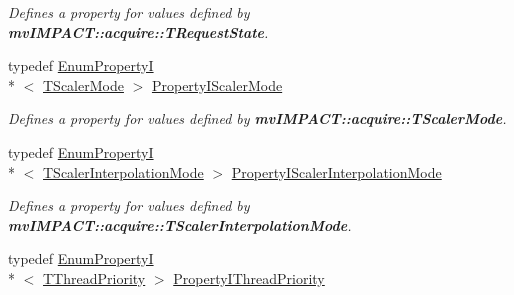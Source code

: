\begin{DoxyCompactItemize}
\begin{DoxyCompactList}\small\item\em Defines a property for values defined by {\bfseries mv\+I\+M\+P\+A\+C\+T\+::acquire\+::\+T\+Request\+State}. \end{DoxyCompactList}\item 
\hypertarget{group___common_interface_ga0adb8ca6f3c1ff4cc9813bcee143580f}{typedef \hyperlink{classmv_i_m_p_a_c_t_1_1acquire_1_1_enum_property_i}{Enum\+Property\+I}\\*
$<$ \hyperlink{group___common_interface_ga7ccd01e604cab9a5204ff969298fcc29}{T\+Scaler\+Mode} $>$ \hyperlink{group___common_interface_ga0adb8ca6f3c1ff4cc9813bcee143580f}{Property\+I\+Scaler\+Mode}}\label{group___common_interface_ga0adb8ca6f3c1ff4cc9813bcee143580f}

\begin{DoxyCompactList}\small\item\em Defines a property for values defined by {\bfseries mv\+I\+M\+P\+A\+C\+T\+::acquire\+::\+T\+Scaler\+Mode}. \end{DoxyCompactList}\item 
\hypertarget{group___common_interface_ga935c38ccadc072128888280fa7a78e0e}{typedef \hyperlink{classmv_i_m_p_a_c_t_1_1acquire_1_1_enum_property_i}{Enum\+Property\+I}\\*
$<$ \hyperlink{group___common_interface_gae0752aaeb2b62ddbcf4782bbf0205f41}{T\+Scaler\+Interpolation\+Mode} $>$ \hyperlink{group___common_interface_ga935c38ccadc072128888280fa7a78e0e}{Property\+I\+Scaler\+Interpolation\+Mode}}\label{group___common_interface_ga935c38ccadc072128888280fa7a78e0e}

\begin{DoxyCompactList}\small\item\em Defines a property for values defined by {\bfseries mv\+I\+M\+P\+A\+C\+T\+::acquire\+::\+T\+Scaler\+Interpolation\+Mode}. \end{DoxyCompactList}\item 
\hypertarget{group___common_interface_ga3d8854715fb4cb82a7d770ba632ae479}{typedef \hyperlink{classmv_i_m_p_a_c_t_1_1acquire_1_1_enum_property_i}{Enum\+Property\+I}\\*
$<$ \hyperlink{group___common_interface_ga2dc400c438444996449c9d056c0883cf}{T\+Thread\+Priority} $>$ \hyperlink{group___common_interface_ga3d8854715fb4cb82a7d770ba632ae479}{Property\+I\+Thread\+Priority}}\label{group___common_interface_ga3d8854715fb4cb82a7d770ba632ae479}


\end{DoxyCompactItemize}

